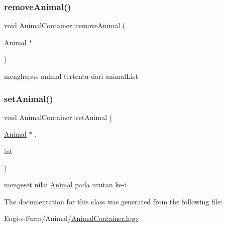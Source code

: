 \subsubsection{\texorpdfstring{removeAnimal()}{removeAnimal()}}
{\footnotesize\ttfamily void Animal\+Container\+::remove\+Animal (\begin{DoxyParamCaption}\item[{\mbox{\hyperlink{class_animal}{Animal}} $\ast$}]{ }\end{DoxyParamCaption})}

menghapus animal tertentu dari animal\+List \mbox{\label{class_animal_container_ac957de33fff063b3506c62c5b68eb541}} 
\subsubsection{\texorpdfstring{setAnimal()}{setAnimal()}}
{\footnotesize\ttfamily void Animal\+Container\+::set\+Animal (\begin{DoxyParamCaption}\item[{\mbox{\hyperlink{class_animal}{Animal}} $\ast$}]{,  }\item[{int}]{ }\end{DoxyParamCaption})}

mengeset nilai \mbox{\hyperlink{class_animal}{Animal}} pada urutan ke-\/i 

The documentation for this class was generated from the following file\+:\begin{DoxyCompactItemize}
\item 
Engi-\/s-\/\+Farm/\+Animal/\mbox{\hyperlink{_animal_container_8hpp}{Animal\+Container.\+hpp}}\end{DoxyCompactItemize}
